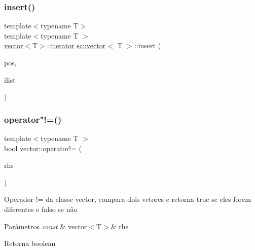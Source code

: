 \mbox{\label{classsc_1_1vector_a4e59b7f5bc99a5436397426626719251}} 
\subsubsection{\texorpdfstring{insert()}{insert()}\hspace{0.1cm}{\footnotesize\ttfamily [9/9]}}
{\footnotesize\ttfamily template$<$typename T$>$ \\
template$<$typename T $>$ \\
\mbox{\hyperlink{classsc_1_1vector}{vector}}$<$T$>$\+::\mbox{\hyperlink{classsc_1_1vector_1_1iterator}{iterator}} \mbox{\hyperlink{classsc_1_1vector}{sc\+::vector}}$<$ T $>$\+::insert (\begin{DoxyParamCaption}\item[{typename \mbox{\hyperlink{classsc_1_1vector}{vector}}$<$ T $>$\+::\mbox{\hyperlink{classsc_1_1vector_1_1iterator}{iterator}}}]{pos,  }\item[{std\+::initializer\+\_\+list$<$ T $>$}]{ilist }\end{DoxyParamCaption})}

\mbox{\label{classsc_1_1vector_a22ba85b963cc80ec631017a5460ea393}} 
\subsubsection{\texorpdfstring{operator"!=()}{operator!=()}}
{\footnotesize\ttfamily template$<$typename T $>$ \\
bool vector\+::operator!= (\begin{DoxyParamCaption}\item[{const \mbox{\hyperlink{classsc_1_1vector}{vector}}$<$ T $>$ \&}]{rhs }\end{DoxyParamCaption})}

Operador != da classe vector, compara dois vetores e retorna true se eles forem diferentes e falso se não 
\begin{DoxyParams}{Parâmetros}
{\em const} & vector$<$\+T$>$\& rhs \\
\hline
\end{DoxyParams}
\begin{DoxyReturn}{Retorna}
boolean 
\end{DoxyReturn}
\mbox{\label{classsc_1_1vector_acb19d7e567b317cb9e9f20b68b923ff9}} 
